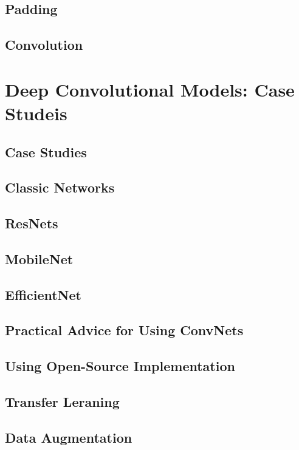 \documentclass[letterpaper,12pt,notitlepage,twoside]{report}
\begin{document}
\subsection{Padding}
\subsection{Convolution}


\section{Deep Convolutional Models: Case Studeis}

\subsection{Case Studies}
\subsection*{Classic Networks}

\subsection*{ResNets}
\subsection*{MobileNet}
\subsection*{EfficientNet}


\subsection{Practical Advice for Using ConvNets}
\subsection*{Using Open-Source Implementation}
\subsection*{Transfer Leraning}
\subsection*{Data Augmentation}
\end{document}
